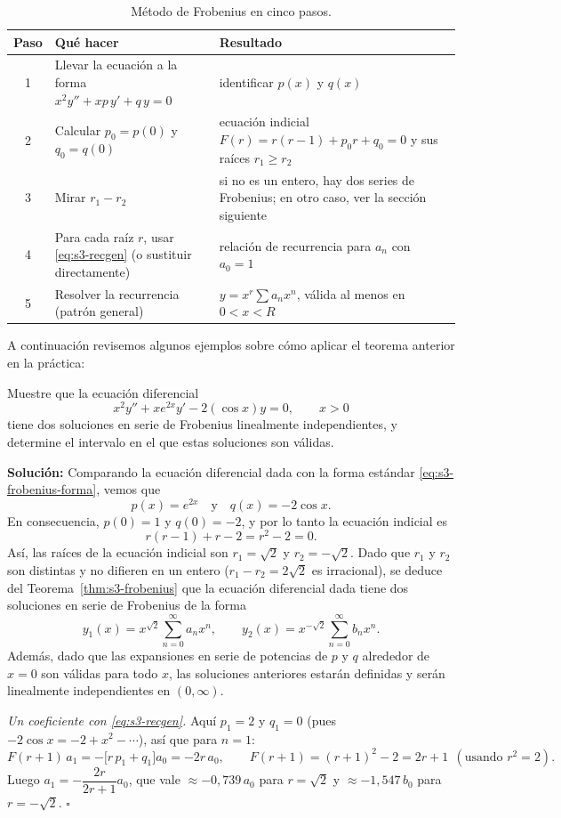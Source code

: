 \begin{table}[H]
\centering
\small
\caption{Método de Frobenius en cinco pasos.}
\label{tab:s3-pasos}
\begin{tabular}{|c|p{5.2cm}|p{7.3cm}|}
\hline
\rowcolor{bbe!15}\textbf{Paso} & \textbf{Qué hacer} & \textbf{Resultado} \\ \hline
1 & Llevar la ecuación a la forma $x^2y''+xp\,y'+q\,y=0$ & identificar $p(x)$ y $q(x)$ \\ \hline
2 & Calcular $p_0=p(0)$ y $q_0=q(0)$ & ecuación indicial $F(r)=r(r-1)+p_0r+q_0=0$ y sus raíces $r_1\ge r_2$ \\ \hline
3 & Mirar $r_1-r_2$ & si no es un entero, hay dos series de Frobenius; en otro caso, ver la sección siguiente \\ \hline
4 & Para cada raíz $r$, usar \eqref{eq:s3-recgen} (o sustituir directamente) & relación de recurrencia para $a_n$ con $a_0=1$ \\ \hline
5 & Resolver la recurrencia (patrón general) & $y=x^r\sum a_nx^n$, válida al menos en $0<x<R$ \\ \hline
\end{tabular}
\end{table}
 
A continuación revisemos algunos ejemplos sobre cómo aplicar el teorema anterior en la práctica:
 
\begin{example}\label{ex:s3-e2x}
     Muestre que la ecuación diferencial
\[ x^2 y'' + x e^{2x} y' - 2(\cos x)y = 0, \qquad x > 0 \]
tiene dos soluciones en serie de Frobenius linealmente independientes, y determine el intervalo en el que estas soluciones son válidas.
 
\noindent \textbf{Solución:} \quad Comparando la ecuación diferencial dada con la forma estándar \eqref{eq:s3-frobenius-forma}, vemos que
\[ p(x) = e^{2x} \quad \text{y} \quad q(x) = -2\cos x. \]
En consecuencia, $p(0) = 1$ y $q(0) = -2$, y por lo tanto la ecuación indicial es
\[ r(r - 1) + r - 2 = r^2 - 2 = 0. \]
Así, las raíces de la ecuación indicial son $r_1 = \sqrt{2}$ y $r_2 = -\sqrt{2}$. Dado que $r_1$ y $r_2$ son distintas y no difieren en un entero ($r_1-r_2=2\sqrt2$ es irracional), se deduce del Teorema~\ref{thm:s3-frobenius} que la ecuación diferencial dada tiene dos soluciones en serie de Frobenius de la forma
\[ y_1(x) = x^{\sqrt{2}} \sum_{n=0}^{\infty} a_n x^n, \qquad y_2(x) = x^{-\sqrt{2}} \sum_{n=0}^{\infty} b_n x^n. \]
Además, dado que las expansiones en serie de potencias de $p$ y $q$ alrededor de $x = 0$ son válidas para todo $x$, las soluciones anteriores estarán definidas y serán linealmente independientes en $(0, \infty)$.
 
\vspace{.2cm}
\noindent\textit{Un coeficiente con \eqref{eq:s3-recgen}.} Aquí $p_1=2$ y $q_1=0$ (pues $-2\cos x=-2+x^2-\cdots$), así que para $n=1$:
\[ F(r+1)\,a_1=-\bigl[r\,p_1+q_1\bigr]a_0=-2r\,a_0,\qquad F(r+1)=(r+1)^2-2=2r+1 \ \ (\text{usando } r^2=2). \]
Luego $a_1=-\dfrac{2r}{2r+1}a_0$, que vale $\approx-0{,}739\,a_0$ para $r=\sqrt2$ y $\approx-1{,}547\,b_0$ para $r=-\sqrt2$. \hfill $\square$
\end{example}
 
